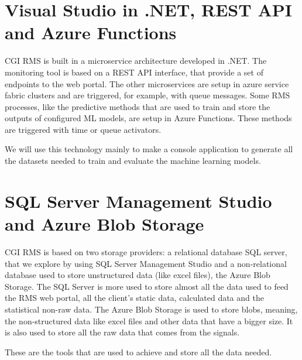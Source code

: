 \section{Visual Studio in .NET, REST API and Azure Functions} 
\label{sub:if_you_use_this_template}
CGI RMS is built in a microservice architecture developed in .NET. The monitoring tool is based on a REST API interface, that provide a set of endpoints to the web portal. The other microservices are setup in azure service fabric clusters and are triggered, for example, with queue messages. Some RMS processes, like the predictive methods that are used to train and store the outputs of configured ML models, are setup in Azure Functions. These methods are triggered with time or queue activators.

We will use this technology mainly to make a console application to generate all the datasets needed to train and evaluate the machine learning models.


\section{SQL Server Management Studio and Azure Blob Storage} 
\label{sub:if_you_use_this_template}
CGI RMS is based on two storage providers: a relational database SQL server, that we explore by using SQL Server Management Studio and a non-relational database used to store unstructured data (like excel files), the Azure Blob Storage.
The SQL Server is more used to store almost all the data used to feed the RMS web portal, all the client’s static data, calculated data and the statistical non-raw data.
The Azure Blob Storage is used to store blobs, meaning, the non-structured data like excel files and other data that have a bigger size. It is also used to store all the raw data that comes from the signals.

These are the tools that are used to achieve and store all the data needed.